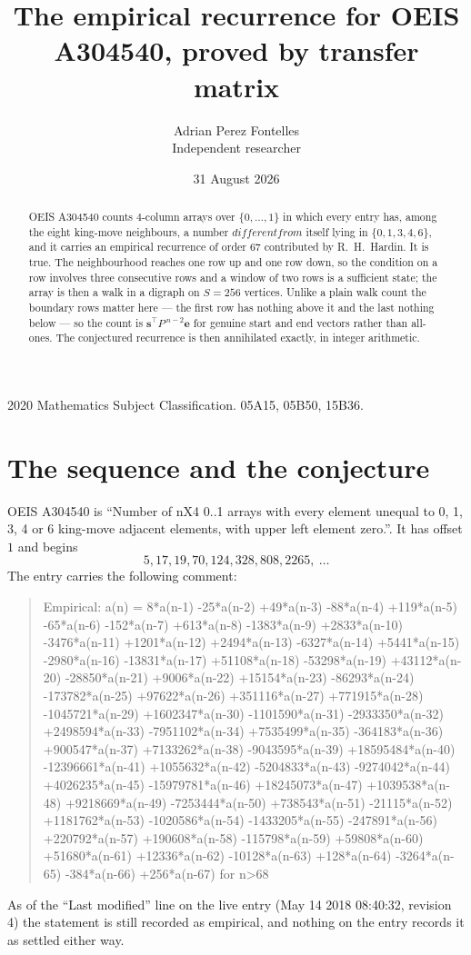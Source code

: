 \documentclass[11pt,a4paper]{article}
\title{The empirical recurrence for OEIS A304540, proved by transfer matrix}
\author{Adrian Perez Fontelles\\ \small Independent researcher}
\date{31 August 2026}
\theoremstyle{plain}
\theoremstyle{definition}
\begin{document}
\maketitle

\begin{abstract}
OEIS A304540 counts $4$-column arrays over $\{0,\dots,1\}$ in which every entry has,
among the eight king-move neighbours, a number $different from$ itself lying in $\{0,1,3,4,6\}$, and it carries an empirical
recurrence of order $67$ contributed by R.~H.~Hardin. It is true. The neighbourhood
reaches one row up and one row down, so the condition on a row involves three consecutive
rows and a window of two rows is a sufficient state; the array is then a walk in a digraph
on $S=256$ vertices. Unlike a plain walk count the boundary rows matter here --- the first
row has nothing above it and the last nothing below --- so the count is
$\mathbf{s}^{\!\top}P^{\,n-2}\mathbf{e}$ for genuine start and end vectors rather than
all-ones. The conjectured recurrence is then annihilated exactly, in integer arithmetic.
\end{abstract}

\noindent\small 2020 Mathematics Subject Classification. 05A15, 05B50, 15B36.\normalsize

\section{The sequence and the conjecture}

OEIS A304540 is ``Number of nX4 0..1 arrays with every element unequal to 0, 1, 3, 4 or 6 king-move adjacent elements, with upper left element zero.''. It has offset
$1$ and begins
\[
5, 17, 19, 70, 124, 328, 808, 2265,\ \dots
\]
The entry carries the following comment:
\begin{quote}\small
Empirical: a(n) = 8*a(n-1) -25*a(n-2) +49*a(n-3) -88*a(n-4) +119*a(n-5) -65*a(n-6) -152*a(n-7) +613*a(n-8) -1383*a(n-9) +2833*a(n-10) -3476*a(n-11) +1201*a(n-12) +2494*a(n-13) -6327*a(n-14) +5441*a(n-15) -2980*a(n-16) -13831*a(n-17) +51108*a(n-18) -53298*a(n-19) +43112*a(n-20) -28850*a(n-21) +9006*a(n-22) +15154*a(n-23) -86293*a(n-24) -173782*a(n-25) +97622*a(n-26) +351116*a(n-27) +771915*a(n-28) -1045721*a(n-29) +1602347*a(n-30) -1101590*a(n-31) -2933350*a(n-32) +2498594*a(n-33) -7951102*a(n-34) +7535499*a(n-35) -364183*a(n-36) +900547*a(n-37) +7133262*a(n-38) -9043595*a(n-39) +18595484*a(n-40) -12396661*a(n-41) +1055632*a(n-42) -5204833*a(n-43) -9274042*a(n-44) +4026235*a(n-45) -15979781*a(n-46) +18245073*a(n-47) +1039538*a(n-48) +9218669*a(n-49) -7253444*a(n-50) +738543*a(n-51) -21115*a(n-52) +1181762*a(n-53) -1020586*a(n-54) -1433205*a(n-55) -247891*a(n-56) +220792*a(n-57) +190608*a(n-58) -115798*a(n-59) +59808*a(n-60) +51680*a(n-61) +12336*a(n-62) -10128*a(n-63) +128*a(n-64) -3264*a(n-65) -384*a(n-66) +256*a(n-67) for n>68
\end{quote}
As of the ``Last modified'' line on the live entry (May 14 2018 08:40:32, revision
4) the statement is still recorded as empirical, and nothing on the entry
records it as settled either way.
\end{document}

